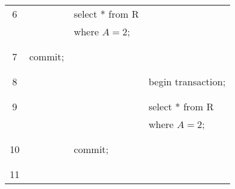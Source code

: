 \documentclass[addpoints,answers,12pt]{exam}
\begin{document}
\begin{questions}
\begin{parts}
\begin{subparts}
\begin{tabular}{|c|l|l|l|}
6 &                                 &  select * from R   & \\
  &                                 &  where $A=2$;      & \\
  &                                 &                    & \\ \hline
  &                                 &                    & \\
7 & commit;                         &                    & \\
  &                                 &                    & \\ \hline
  &                                 &                    & \\
8 &                                 &                    & begin transaction; \\
  &                                 &                    & \\ \hline
  &                                 &                    & \\
9 &                                 &                    & select * from R  \\
  &                                 &                    & where $A=2$; \\
  &                                 &                    & \\ \hline
  &                                 &                    & \\
10 &                                & commit;            & \\
  &                                 &                    & \\ \hline
  &                                 &                    & \\
11 & 
                                    &                     & \\

\end{tabular}
\end{subparts}
\end{parts}
\end{questions}
\end{document}
